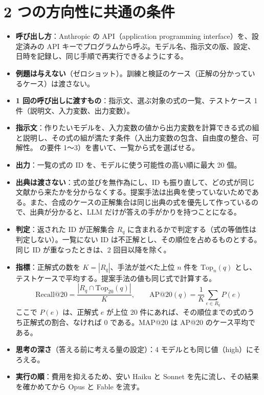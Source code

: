\documentclass[11pt,a4paper]{ltjsarticle}
\begin{document}
\section{2 つの方向性に共通の条件}
\begin{itemize}[leftmargin=1.5em]
  \item \textbf{呼び出し方}：Anthropic の API（application programming interface）を、設定済みの API キーでプログラムから呼ぶ。モデル名、指示文の版、設定、日時を記録し、同じ手順で再実行できるようにする。
  \item \textbf{例題は与えない}（ゼロショット）。訓練と検証のケース（正解の分かっているケース）は渡さない。
  \item \textbf{1 回の呼び出しに渡すもの}：指示文、選ぶ対象の式の一覧、テストケース 1 件（説明文、入力変数、出力変数）。
  \item \textbf{指示文}：作りたいモデルを、入力変数の値から出力変数を計算できる式の組と説明し、その式の組が満たす条件（入出力変数の包含、自由度の整合、可解性。\citealp{CombineEq} の要件 1〜3）を書いて、一覧から式を選ばせる。
  \item \textbf{出力}：一覧の式の ID を、モデルに使う可能性の高い順に最大 20 個。
  \item \textbf{出典は渡さない}：式の並びを無作為にし、ID も振り直して、どの式が同じ文献から来たかを分からなくする。提案手法は出典を使っていないためである。また、合成のケースの正解集合は同じ出典の式を優先して作っているので、出典が分かると、LLM だけが答えの手がかりを持つことになる。
  \item \textbf{判定}：返された ID が正解集合 $R_q$ に含まれるかで判定する（式の等価性は判定しない）。一覧にない ID は不正解とし、その順位を占めるものとする。同じ ID が重なったときは、2 回目以降を除く。
  \item \textbf{指標}：正解式の数を $K = |R_q|$、手法が並べた上位 $n$ 件を $\mathrm{Top}_n(q)$ とし、テストケースで平均する。提案手法の値も同じ式で計算する。
  \begin{equation*}
    \mathrm{Recall@20} = \frac{|R_q \cap \mathrm{Top}_{20}(q)|}{K}, \qquad
    \mathrm{AP@20}(q) = \frac{1}{K} \sum_{e \in R_q} P(e)
  \end{equation*}
  ここで $P(e)$ は、正解式 $e$ が上位 20 件にあれば、その順位までの式のうち正解式の割合、なければ 0 である。MAP@20 は AP@20 のケース平均である。
  \item \textbf{思考の深さ}（答える前に考える量の設定）：4 モデルとも同じ値（high）にそろえる。
  \item \textbf{実行の順}：費用を抑えるため、安い Haiku と Sonnet を先に流し、その結果を確かめてから Opus と Fable を流す。
\end{itemize}
\end{document}
